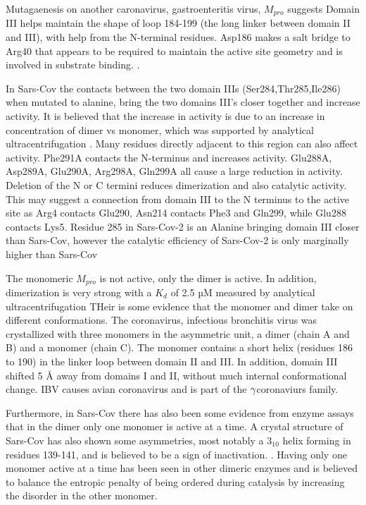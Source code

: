 \documentclass{biophys-new}
\begin{document}
Mutagaenesis on another caronavirus, gastroenteritis virus, $M_{pro}$ suggests Domain III helps maintain the shape of loop 184-199 (the long linker between domain II and III), with help from the N-terminal residues. Asp186 makes a salt bridge to Arg40 that appears to be required to maintain the active site geometry and is involved in substrate binding. \cite{anand2002structure}.

In Sars-Cov the contacts between the two domain IIIs (Ser284,Thr285,Ile286) when mutated to alanine, bring the two domains III's closer together and increase activity.\cite{shi2006catalysis} It is believed that the increase in activity is due to an increase in concentration of dimer vs monomer, which was supported by analytical ultracentrifugation \cite{hsu2005critical}. Many residues directly adjacent to this region can also affect activity. Phe291A contacts the N-terminus and increases activity. Glu288A, Asp289A, Glu290A, Arg298A, Gln299A all cause a large reduction in activity. Deletion of the N or C termini reduces dimerization and also catalytic activity.\cite{shi2006catalysis}\cite{shi2004dissection} This may suggest a connection from domain III to the N terminus to the active site as Arg4 contacts Glu290, Asn214 contacts Phe3 and Gln299, while Glu288 contacts Lys5. Residue 285 in Sars-Cov-2 is an Alanine bringing domain III closer than Sars-Cov, however the catalytic efficiency of Sars-Cov-2 is only marginally higher than Sars-Cov \cite{Zhang409} 

The monomeric $M_{pro}$ is not active, only the dimer is active.\cite{chen2006only} In addition, dimerization is very strong with a $K_{d}$ of 2.5 µM measured by analytical ultracentrifugation \cite{Zhang409} THeir is some evidence that the monomer and dimer take on different conformations. The coronavirus, infectious bronchitis virus was crystallized with three monomers in the asymmetric unit, a dimer (chain A and B) and a monomer (chain C)\cite{xue2008structures}. The monomer contains a short helix (residues 186 to 190) in the linker loop between domain II and III. In addition, domain III shifted 5 Å away from domains I and II, without much internal conformational change. IBV causes avian coronavirus and is part of the $\MakeUppercase{\gamma}$coronaviurs family.

Furthermore, in Sars-Cov there has also been some evidence from enzyme assays that in the dimer only one monomer is active at a time\cite{chen2006only}. A crystal structure of Sars-Cov has also shown some asymmetries, most notably a $3_{10}$ helix forming in residues 139-141, and is believed to be a sign of inactivation. \cite{yang2003crystal}. Having only one monomer active at a time has been seen in other dimeric enzymes and is believed to balance the entropic penalty of being ordered during catalysis by increasing the disorder in the other monomer.\cite{kim2017role}
\end{document}

